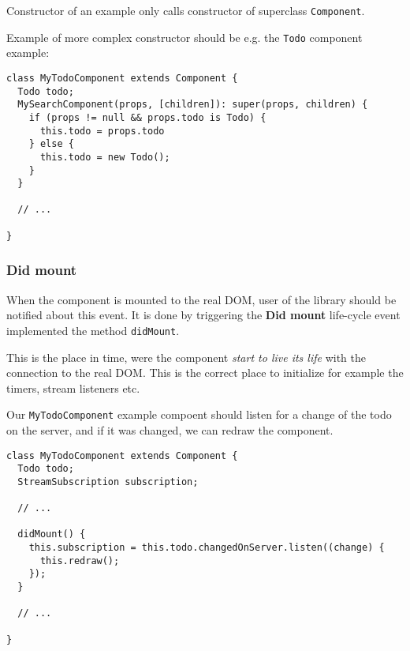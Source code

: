 \documentclass[oneside, 12pt]{book}
\begin{document}
      Constructor of an example only calls constructor of superclass \texttt{Component}.

      Example of more complex constructor should be e.g. the \texttt{Todo} component example:
      \begin{verbatim}
class MyTodoComponent extends Component {
  Todo todo;
  MySearchComponent(props, [children]): super(props, children) {
    if (props != null && props.todo is Todo) {
      this.todo = props.todo
    } else {
      this.todo = new Todo();
    }
  }

  // ...

}
      \end{verbatim}



    \subsubsection{Did mount}\label{subsec:our-architecture-lifecycle-didmount}

      When the component is mounted to the real DOM, user of the library should be notified about this event. 
      It is done by triggering the \textbf{Did mount} life-cycle event implemented the method \texttt{didMount}. 

      This is the place in time, were the component \textit{start to live its life} with the connection to the real DOM.
      This is the correct place to initialize for example the timers, stream listeners etc. 

      Our \texttt{MyTodoComponent} example compoent should listen for a change of the todo on the server, 
      and if it was changed, we can redraw the component.
      \begin{verbatim}
class MyTodoComponent extends Component {
  Todo todo;
  StreamSubscription subscription;

  // ...

  didMount() {
    this.subscription = this.todo.changedOnServer.listen((change) {
      this.redraw();
    });
  }

  // ...

}
      \end{verbatim}

\end{document}
